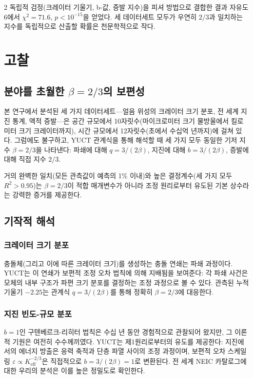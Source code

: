 \documentclass[11pt,a4paper]{article}
\newcommand{\eps}{\varepsilon}
\newcommand{\Keff}{K_{\mathrm{eff}}}
\newcommand{\betaf}{\beta}
\begin{document}
\begin{multicols}{2}
		독립적 검정(크레이터 기울기, b-값, 증발 지수)을 피셔 방법으로 결합한 결과 자유도 6에서 \(\chi^2 = 71.6\), \(p < 10^{-15}\)을 얻었다. 세 데이터세트 모두가 우연히 \(2/3\)과 일치하는 지수를 독립적으로 산출할 확률은 천문학적으로 작다.
		
		\section{고찰}
		
		\subsection{분야를 초월한 \(\betaf = 2/3\)의 보편성}
		
		본 연구에서 분석된 세 가지 데이터세트—얼음 위성의 크레이터 크기 분포, 전 세계 지진 통계, 액적 증발—은 공간 규모에서 10자릿수(마이크로미터 크기 물방울에서 킬로미터 크기 크레이터까지), 시간 규모에서 12자릿수(초에서 수십억 년까지)에 걸쳐 있다. 그럼에도 불구하고, YUCT 관계식을 통해 해석할 때 세 가지 모두 동일한 기저 지수 \(\betaf = 2/3\)을 나타낸다: 파쇄에 대해 \(q = 3/(2\betaf)\), 지진에 대해 \(b = 3/(2\betaf)\), 증발에 대해 직접 지수 \(2/3\).
		
		거의 완벽한 일치(모든 관측값이 예측의 1\% 이내)와 높은 결정계수(세 가지 모두 \(R^2 > 0.95\))는 \(\betaf = 2/3\)이 적합 매개변수가 아니라 조정 원리로부터 유도된 기본 상수라는 강력한 증거를 제공한다.
		
		\subsection{기작적 해석}
		
		\subsubsection{크레이터 크기 분포}
		충돌체(그리고 이에 따른 크레이터 크기)를 생성하는 충돌 연쇄는 파쇄 과정이다. YUCT는 이 연쇄가 보편적 조정 오차 법칙에 의해 지배됨을 보여준다: 각 파쇄 사건은 모체의 내부 구조가 파편 크기 분포를 결정하는 조정 과정으로 볼 수 있다. 관측된 누적 기울기 \(-2.25\)는 관계식 \(q = 3/(2\betaf)\)를 통해 정확히 \(\betaf = 2/3\)에 대응한다.
		
		\subsubsection{지진 빈도-규모 분포}
		\(b = 1\)인 구텐베르크-리히터 법칙은 수십 년 동안 경험적으로 관찰되어 왔지만, 그 이론적 기원은 여전히 수수께끼였다. YUCT는 제1원리로부터의 유도를 제공한다: 지진에서의 에너지 방출은 응력 축적과 단층 파열 사이의 조정 과정이며, 보편적 오차 스케일링 \(\eps \propto \Keff^{-2/3}\)은 직접적으로 \(b = 3/(2\betaf) = 1\)로 변환된다. 전 세계 NEIC 카탈로그에 대한 우리의 분석은 이를 높은 정밀도로 확인한다.
		

\end{multicols}
\end{document}
